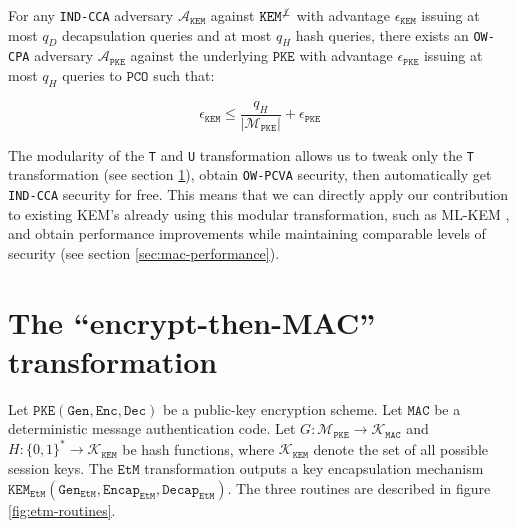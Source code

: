 \documentclass[floatrow,journal=tches,submission]{iacrtrans}
\newcommand{\monospace}{\texttt}
\newcommand{\pke}{\monospace{PKE}}
\newcommand{\keygen}{\monospace{Gen}}
\newcommand{\encrypt}{\monospace{Enc}}
\newcommand{\decrypt}{\monospace{Dec}}
\newcommand{\kem}{\monospace{KEM}}
\newcommand{\encap}{\monospace{Encap}}
\newcommand{\decap}{\monospace{Decap}}
\newcommand{\etm}{\monospace{EtM}}  %
\newcommand{\mac}{\monospace{MAC}}
\newcommand{\pco}{\monospace{PCO}}
\newcommand{\norm}[1]{\left\lvert #1 \right\rvert}
\begin{document}
\begin{theorem}\label{thm:u-notbot}
    For any \monospace{IND-CCA} adversary $\mathcal{A}_\kem$ against $\kem^{\not\bot}$ with advantage $\epsilon_\kem$ issuing at most $q_D$ decapsulation queries and at most $q_H$ hash queries, there exists an \monospace{OW-CPA} adversary $\mathcal{A}_\pke$ against the underlying $\pke$ with advantage $\epsilon_\pke$ issuing at most $q_H$ queries to $\pco$ such that:

    \begin{equation*}
        \epsilon_\kem \leq \frac{q_H}{\norm{\mathcal{M}_\pke}} + \epsilon_\pke
    \end{equation*}
\end{theorem}

The modularity of the \monospace{T} and \monospace{U} transformation allows us to tweak only the \monospace{T} transformation (see section \ref{sec:main-results}), obtain \monospace{OW-PCVA} security, then automatically get \monospace{IND-CCA} security for free. This means that we can directly apply our contribution to existing KEM's already using this modular transformation, such as ML-KEM \cite{key2023mechanism}, and obtain performance improvements while maintaining comparable levels of security (see section \ref{sec:mac-performance}).

\section{The ``encrypt-then-MAC'' transformation}\label{sec:main-results}
Let $\pke(\keygen, \encrypt, \decrypt)$ be a public-key encryption scheme. Let $\mac$ be a deterministic message authentication code. Let $G: \mathcal{M}_\pke \rightarrow \mathcal{K}_\mac$ and $H: \{0,1\}^\ast \rightarrow \mathcal{K}_\kem$ be hash functions, where $\mathcal{K}_\kem$ denote the set of all possible session keys. The $\etm$ transformation outputs a key encapsulation mechanism $\kem_\etm(\keygen_\etm, \encap_\etm, \decap_\etm)$. The three routines are described in figure \ref{fig:etm-routines}.
\end{document}
